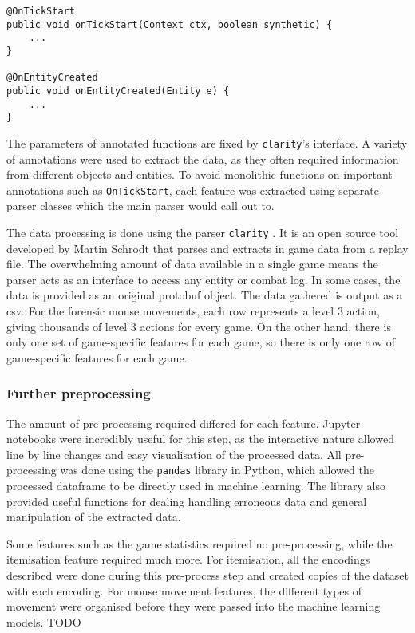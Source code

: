 \documentclass[Report.tex]{subfiles}
\begin{document}
\begin{lstlisting}[caption=Annotations and function definitions for parsing must adhere to \texttt{clarity}'s interface.]
@OnTickStart
public void onTickStart(Context ctx, boolean synthetic) {
    ...
}

@OnEntityCreated
public void onEntityCreated(Entity e) {
    ...
}
\end{lstlisting}

The parameters of annotated functions are fixed by \texttt{clarity}'s interface. A variety of annotations were used to extract the data, as they often required information from different objects and entities. To avoid monolithic functions on important annotations such as \texttt{OnTickStart}, each feature was extracted using separate parser classes which the main parser would call out to. 

The data processing is done using the parser \texttt{clarity} \cite{clarity}. It is an open source tool developed by Martin Schrodt that parses and extracts in game data from a replay file. The overwhelming amount of data available in a single game means the parser acts as an interface to access any entity or combat log. In some cases, the data is provided as an original protobuf object. The data gathered is output as a csv. For the forensic mouse movements, each row represents a level 3 action, giving thousands of level 3 actions for every game. On the other hand, there is only one set of game-specific features for each game, so there is only one row of game-specific features for each game.

\subsubsection{Further preprocessing}
The amount of pre-processing required differed for each feature. 
Jupyter notebooks were incredibly useful for this step, as the interactive nature allowed line by line changes and easy visualisation of the processed data. All pre-processing was done using the \texttt{pandas} library in Python, which allowed the processed dataframe to be directly used in machine learning. The library also provided useful functions for dealing handling erroneous data and general manipulation of the extracted data. 

Some features such as the game statistics required no pre-processing, while the itemisation feature required much more. For itemisation, all the encodings described were done during this pre-process step and created copies of the dataset with each encoding. For mouse movement features, the different types of movement were organised before they were passed into the machine learning models. TODO
\end{document}
